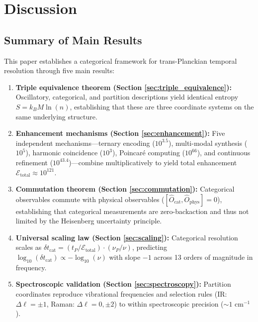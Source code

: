 \documentclass[twocolumn,10pt]{article}
\theoremstyle{remark}
\begin{document}
\section{Discussion}
\label{sec:discussion}

\subsection{Summary of Main Results}

This paper establishes a categorical framework for trans-Planckian temporal resolution through five main results:

\begin{enumerate}
    \item \textbf{Triple equivalence theorem (Section \ref{sec:triple_equivalence}):} Oscillatory, categorical, and partition descriptions yield identical entropy $S = k_B M \ln(n)$, establishing that these are three coordinate systems on the same underlying structure.
    
    \item \textbf{Enhancement mechanisms (Section \ref{sec:enhancement}):} Five independent mechanisms—ternary encoding ($10^{3.5}$), multi-modal synthesis ($10^{5}$), harmonic coincidence ($10^{3}$), Poincaré computing ($10^{66}$), and continuous refinement ($10^{43.4}$)—combine multiplicatively to yield total enhancement $\mathcal{E}_{\text{total}} \approx 10^{121}$.
    
    \item \textbf{Commutation theorem (Section \ref{sec:commutation}):} Categorical observables commute with physical observables ($[\hat{O}_{\text{cat}}, \hat{O}_{\text{phys}}] = 0$), establishing that categorical measurements are zero-backaction and thus not limited by the Heisenberg uncertainty principle.
    
    \item \textbf{Universal scaling law (Section \ref{sec:scaling}):} Categorical resolution scales as $\delta t_{\text{cat}} = (t_P/\mathcal{E}_{\text{total}}) \cdot (\nu_P/\nu)$, predicting $\log_{10}(\delta t_{\text{cat}}) \propto -\log_{10}(\nu)$ with slope $-1$ across 13 orders of magnitude in frequency.
    
    \item \textbf{Spectroscopic validation (Section \ref{sec:spectroscopy}):} Partition coordinates reproduce vibrational frequencies and selection rules (IR: $\Delta \ell = \pm 1$, Raman: $\Delta \ell = 0, \pm 2$) to within spectroscopic precision ($\sim 1$ cm$^{-1}$).
\end{enumerate}
\end{document}
